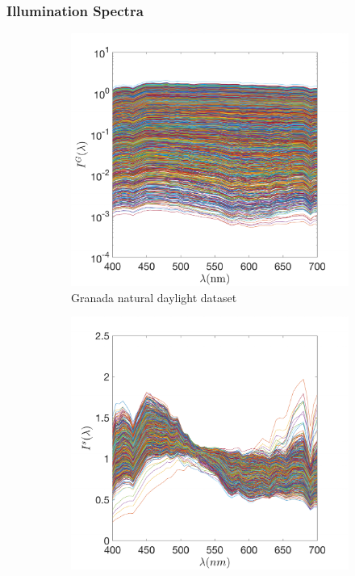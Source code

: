 \documentclass{jov}
\begin{document}
\subsubsection{Illumination Spectra}
\begin{figure}
\centering
	\begin{subfigure}[b]{0.3 \textwidth}
    \centering
        \includegraphics[width=\textwidth]{../Figures/Figure6/Figure6_a.pdf}
        \caption{Granada natural daylight dataset}
        \label{fig:granadaSpectra}
    \end{subfigure}
    \begin{subfigure}[b]{0.3\textwidth}
    \centering
        \includegraphics[width=\textwidth]{../Figures/Figure6/Figure6_b.pdf}

\end{subfigure}
\end{figure}
\end{document}
